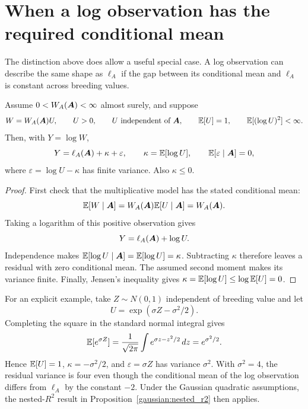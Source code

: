 \section{When a log observation has the required conditional mean}

The distinction above does allow a useful special case. A log observation can
describe the same shape as \(\ell_A\) if the gap between its conditional mean
and \(\ell_A\) is constant across breeding values.

\begin{proposition}
\label{conditioning:log_gap_model}
Assume \(0<W_A(\boldsymbol{A})<\infty\) almost surely, and suppose
\[
 W=W_A(\boldsymbol{A})U,
 \qquad U>0,\qquad U\ \hbox{independent of }\boldsymbol{A},
 \qquad \mathbb E[U]=1,\qquad \mathbb E[(\log U)^2]<\infty.
\]
Then, with \(Y=\log W\),
\begin{equation}
 Y=\ell_A(\boldsymbol{A})+\kappa+\varepsilon,
 \qquad
 \kappa=\mathbb E[\log U],\qquad
 \mathbb E[\varepsilon\mid\boldsymbol{A}]=0,
 \label{conditioning:constant_gap}
\end{equation}
where \(\varepsilon=\log U-\kappa\) has finite variance. Also \(\kappa\leq0\).
\end{proposition}

\begin{proof}
First check that the multiplicative model has the stated conditional mean:
\[
 \mathbb E[W\mid\boldsymbol{A}]
 =W_A(\boldsymbol{A})\mathbb E[U\mid\boldsymbol{A}]
 =W_A(\boldsymbol{A}).
\]
Taking a logarithm of this positive observation gives
\[
 Y=\ell_A(\boldsymbol{A})+\log U.
\]
Independence makes \(\mathbb E[\log U\mid\boldsymbol{A}]=\mathbb E[\log U]=\kappa\). Subtracting
\(\kappa\) therefore leaves a residual with zero conditional mean. The assumed
second moment makes its variance finite. Finally, Jensen's inequality gives
\(\kappa=\mathbb E[\log U]\leq\log\mathbb E[U]=0\).
\end{proof}

For an explicit example, take \(Z\sim N(0,1)\) independent of breeding value
and let
\[
 U=\exp(\sigma Z-\sigma^2/2).
\]
Completing the square in the standard normal integral gives
\[
 \mathbb E[e^{\sigma Z}]
 =\frac{1}{\sqrt{2\pi}}\int
   e^{\sigma z-z^2/2}\,dz
 =e^{\sigma^2/2}.
\]
Hence \(\mathbb E[U]=1\), \(\kappa=-\sigma^2/2\), and
\(\varepsilon=\sigma Z\) has variance \(\sigma^2\).
With \(\sigma^2=4\), the residual variance is four even though the conditional
mean of the log observation differs from \(\ell_A\) by the constant \(-2\).
Under the Gaussian quadratic assumptions, the nested-\(R^2\) result in
Proposition~\ref{gaussian:nested_r2} then applies.

